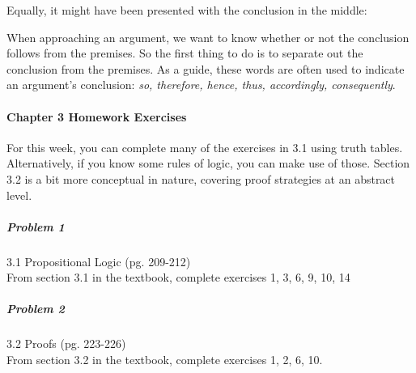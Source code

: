 \documentclass[11pt]{article} %
\begin{document}
	\noindent
	Equally, it might have been presented with the conclusion in the
	middle:\\
	
	\vspace{5mm}
	
	When approaching an argument, we want to know whether or not the conclusion follows from the premises. So the first thing to do is to separate out the conclusion from the premises. As a guide, these words are often used to indicate an argument’s conclusion: \textit{so, therefore, hence, thus, accordingly, consequently}. \\
	
	
	
	\paragraph{Chapter 3 Homework Exercises} For this week, you can complete many of the exercises in 3.1 using truth tables. Alternatively, if you know some rules of logic, you can make use of those. Section 3.2 is a bit more conceptual in nature, covering proof strategies at an abstract level.
	
	\subparagraph{Problem 1} 3.1 Propositional Logic (pg. 209-212) \\
			
		From section 3.1 in the textbook, complete exercises 1, 3, 6, 9, 10, 14
	
	\subparagraph{Problem 2} 3.2 Proofs (pg. 223-226) \\
	
		From section 3.2 in the textbook, complete exercises 1, 2, 6, 10.
	
	
	
		
\end{document}

